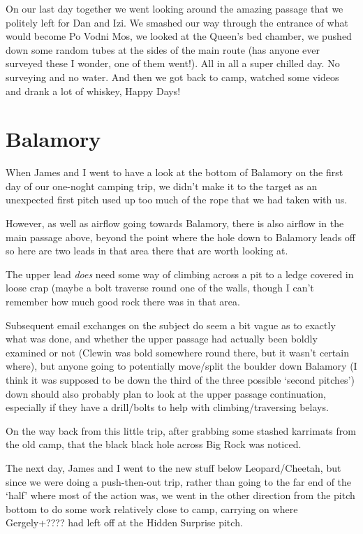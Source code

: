 On our last day together we went looking around the amazing passage that
we politely left for Dan and Izi. We smashed our way through the
entrance of what would become Po Vodni Mos, we looked at the Queen's bed
chamber, we pushed down some random tubes at the sides of the main route
(has anyone ever surveyed these I wonder, one of them went!). All in all
a super chilled day. No surveying and no water. And then we got back to
camp, watched some videos and drank a lot of whiskey, Happy Days!


\section{Balamory}\label{balamory-1}

When James and I went to have a look at the bottom of Balamory on the
first day of our one-noght camping trip, we didn't make it to the target
as an unexpected first pitch used up too much of the rope that we had
taken with us.

However, as well as airflow going towards Balamory, there is also
airflow in the main passage above, beyond the point where the hole down
to Balamory leads off so here are two leads in that area there that are
worth looking at.

The upper lead \emph{does} need some way of climbing across a pit to a
ledge covered in loose crap (maybe a bolt traverse round one of the
walls, though I can't remember how much good rock there was in that
area.

Subsequent email exchanges on the subject do seem a bit vague as to
exactly what was done, and whether the upper passage had actually been
boldly examined or not (Clewin was bold somewhere round there, but it
wasn't certain where), but anyone going to potentially move/split the
boulder down Balamory (I think it was supposed to be down the third of
the three possible `second pitches') down should also probably plan to
look at the upper passage continuation, especially if they have a
drill/bolts to help with climbing/traversing belays.

On the way back from this little trip, after grabbing some stashed
karrimats from the old camp, that the black black hole across Big Rock
was noticed.

The next day, James and I went to the new stuff below Leopard/Cheetah,
but since we were doing a push-then-out trip, rather than going to the
far end of the `half' where most of the action was, we went in the other
direction from the pitch bottom to do some work relatively close to
camp, carrying on where Gergely+???? had left off at the Hidden Surprise
pitch.

